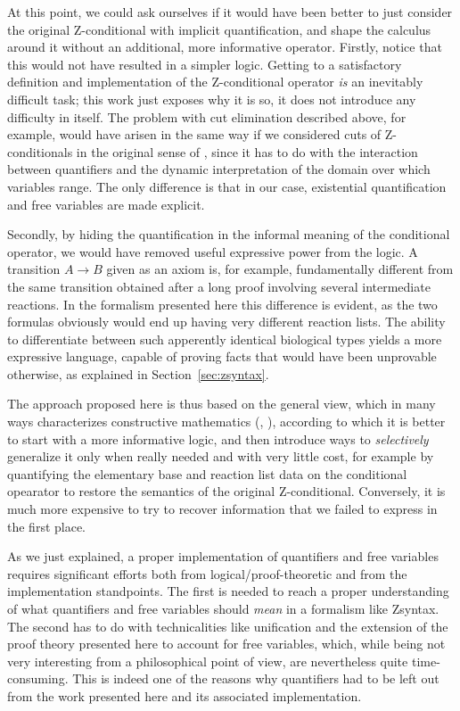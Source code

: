 At this point, we could ask ourselves if it would have been better to just
consider the original Z-conditional with implicit quantification, and shape the
calculus around it without an additional, more informative operator. Firstly,
notice that this would not have resulted in a simpler logic. Getting to a
satisfactory definition and implementation of the Z-conditional operator
\emph{is} an inevitably difficult task; this work just exposes why it is so, it
does not introduce any difficulty in itself. The problem with cut elimination
described above, for example, would have arisen in the same way if we considered
cuts of Z-conditionals in the original sense of \cite{adding-logic}, since it
has to do with the interaction between quantifiers and the dynamic
interpretation of the domain over which variables range. The only difference is
that in our case, existential quantification and free variables are made
explicit.

Secondly, by hiding the quantification in the informal meaning of the
conditional operator, we would have removed useful expressive power from the
logic. A transition $A \rightarrow B$ given as an axiom is, for example,
fundamentally different from the same transition obtained after a long proof
involving several intermediate reactions. In the formalism presented here this
difference is evident, as the two formulas obviously would end up having very
different reaction lists. The ability to differentiate between such apperently
identical biological types yields a more expressive language, capable of proving
facts that would have been unprovable otherwise, as explained in
Section~\ref{sec:zsyntax}.

The approach proposed here is thus based on the general view, which in many ways
characterizes constructive mathematics (\cite{richman}, \cite{unif}), according
to which it is better to start with a more informative logic, and then introduce
ways to \emph{selectively} generalize it only when really needed and with very
little cost, for example by quantifying the elementary base and reaction list
data on the conditional opearator to restore the semantics of the original
Z-conditional. Conversely, it is much more expensive to try to recover
information that we failed to express in the first place.

As we just explained, a proper implementation of quantifiers and free variables
requires significant efforts both from logical/proof-theoretic and from the
implementation standpoints. The first is needed to reach a proper understanding
of what quantifiers and free variables should \emph{mean} in a formalism like
Zsyntax. The second has to do with technicalities like unification and the
extension of the proof theory presented here to account for free variables,
which, while being not very interesting from a philosophical point of view, are
nevertheless quite time-consuming. This is indeed one of the reasons why
quantifiers had to be left out from the work presented here and its associated
implementation.

